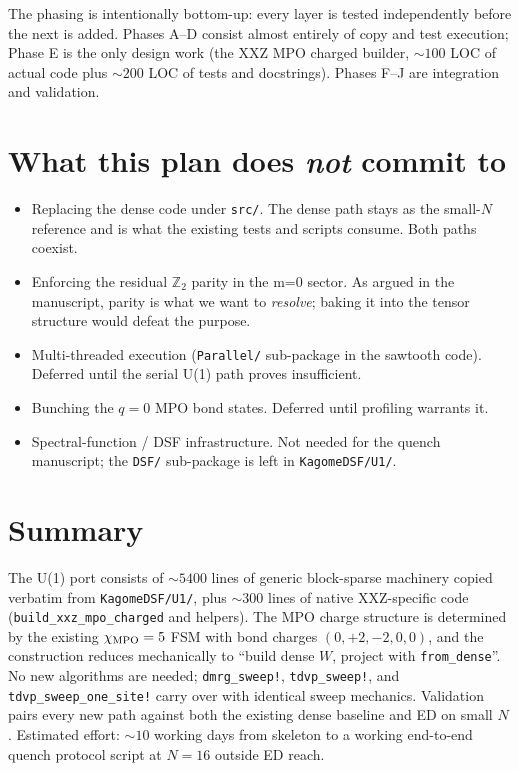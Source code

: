 \documentclass[11pt]{article}
\begin{document}
The phasing is intentionally bottom-up: every layer is tested independently
before the next is added.  Phases A--D consist almost entirely of copy and
test execution; Phase E is the only design work (the XXZ MPO charged
builder, $\sim 100$ LOC of actual code plus $\sim 200$ LOC of tests and
docstrings).  Phases F--J are integration and validation.

\section{What this plan does \emph{not} commit to}

\begin{itemize}[leftmargin=2em]
  \item Replacing the dense code under \texttt{src/}.  The dense path stays
        as the small-$N$ reference and is what the existing tests and scripts
        consume.  Both paths coexist.
  \item Enforcing the residual $\mathbb{Z}_2$ parity in the m=0 sector.  As
        argued in the manuscript, parity is what we want to \emph{resolve};
        baking it into the tensor structure would defeat the purpose.
  \item Multi-threaded execution (\texttt{Parallel/} sub-package in the
        sawtooth code).  Deferred until the serial U(1) path proves
        insufficient.
  \item Bunching the $q=0$ MPO bond states.  Deferred until profiling
        warrants it.
  \item Spectral-function / DSF infrastructure.  Not needed for the quench
        manuscript; the \texttt{DSF/} sub-package is left in
        \texttt{KagomeDSF/U1/}.
\end{itemize}

\section{Summary}

The U(1) port consists of $\sim 5400$ lines of generic block-sparse machinery
copied verbatim from \texttt{KagomeDSF/U1/}, plus $\sim 300$ lines of native
XXZ-specific code (\texttt{build\_xxz\_mpo\_charged} and helpers).  The MPO
charge structure is determined by the existing $\chi_{\rm MPO}=5$ FSM with
bond charges $(0,+2,-2,0,0)$, and the construction reduces mechanically to
``build dense $W$, project with \texttt{from\_dense}''.  No new algorithms
are needed; \texttt{dmrg\_sweep!}, \texttt{tdvp\_sweep!}, and
\texttt{tdvp\_sweep\_one\_site!} carry over with identical sweep mechanics.
Validation pairs every new path against both the existing dense baseline
and ED on small $N$.  Estimated effort: $\sim 10$ working days from
skeleton to a working end-to-end quench protocol script at $N=16$ outside
ED reach.
\end{document}
